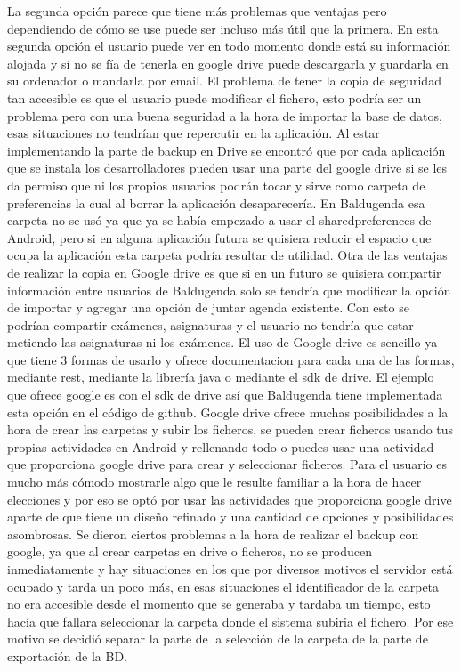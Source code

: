 La segunda opción parece que tiene más problemas que ventajas pero dependiendo de cómo se use puede ser incluso más útil que la primera.
En esta segunda opción el usuario puede ver en todo momento donde está su información alojada y si no se fía de tenerla en google drive puede descargarla y guardarla en su ordenador o mandarla por email.
El problema de tener la copia de seguridad tan accesible es que el usuario puede modificar el fichero, esto podría ser un problema pero con una buena seguridad a la hora de importar la base de datos, esas situaciones no tendrían que repercutir en la aplicación.
Al estar implementando la parte de backup en Drive se encontró que por cada aplicación que se instala los desarrolladores pueden usar una parte del google drive si se les da permiso que ni los propios usuarios podrán tocar y sirve como carpeta de preferencias la cual al borrar la aplicación desaparecería.
En Baldugenda esa carpeta no se usó ya que ya se había empezado a usar el sharedpreferences de Android, pero si en alguna aplicación futura se quisiera reducir el espacio que ocupa la aplicación esta carpeta podría resultar de utilidad.
Otra de las ventajas de realizar la copia en Google drive es que si en un futuro se quisiera compartir información entre usuarios de Baldugenda solo se tendría que modificar la opción de importar y agregar una opción de juntar agenda existente. Con esto se podrían compartir exámenes, asignaturas y el usuario no tendría que estar metiendo las asignaturas ni los exámenes.
El uso de Google drive es sencillo ya que tiene 3 formas de usarlo y ofrece documentacion para cada una de las formas, mediante rest, mediante la librería java o mediante el sdk de drive.
El ejemplo que ofrece google es con el sdk de drive así que Baldugenda tiene implementada esta opción en el código de github.
Google drive ofrece muchas posibilidades a la hora de crear las carpetas y subir los ficheros, se pueden crear ficheros usando tus propias actividades en Android y rellenando todo o puedes usar una actividad que proporciona google drive para crear y seleccionar ficheros.
Para el usuario es mucho más cómodo mostrarle algo que le resulte familiar a la hora de hacer elecciones y por eso se optó por usar las actividades que proporciona google drive aparte de que tiene un diseño refinado y una cantidad de opciones y posibilidades asombrosas.
Se dieron ciertos problemas a la hora de realizar el backup con google, ya que al crear carpetas en drive o ficheros, no se producen inmediatamente y hay situaciones en los que por diversos motivos el servidor está ocupado y tarda un poco más, en esas situaciones el identificador de la carpeta no era accesible desde el momento que se generaba y tardaba un tiempo, esto hacía que fallara seleccionar la carpeta donde el sistema subiria el fichero.
Por ese motivo se decidió separar la parte de la selección de la carpeta de la parte de exportación de la BD.

